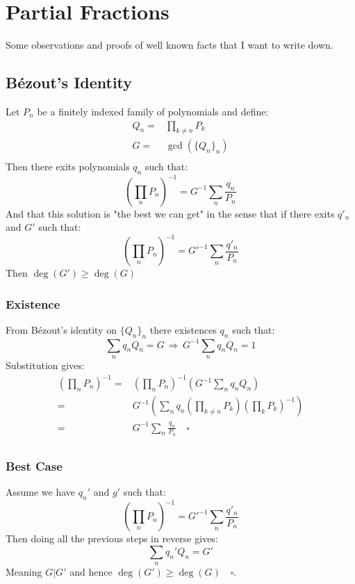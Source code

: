 
\section{Partial Fractions}
Some observations and proofs of well known facts that I want to write down.

\subsection{Bézout's Identity}
Let $P_n$ be a finitely indexed family of polynomials and define:
\begin{equation*}
\begin{aligned}
Q_n =& \prod_{k\neq n}P_k\\
G =&\gcd(\{Q_n\}_n)\\
\end{aligned}
\end{equation*}
Then there exits polynomials $q_n$ such that:
\[\left(\prod_n P_n\right)^{-1} = G^{-1}\sum_n\frac{q_n}{P_n}\]
And that this solution is "the best we can get" in the sense that if there exits $q'_n$ and $G'$ such that:
\[\left(\prod_n P_n\right)^{-1} = G'^{-1}\sum_n\frac{q'_n}{P_n}\]
Then $\deg(G') \geq \deg(G)$

\subsubsection{Existence}
From Bézout's identity on $\{Q_n\}_n$ there existences $q_n$ such that:
\[\sum_n q_n Q_n = G \,\Rightarrow\, G^{-1}\sum_n q_n Q_n = 1\]
Substitution gives:
\begin{equation*}
\begin{aligned}
\left(\prod_n P_n\right)^{-1} =& \left(\prod_n P_n\right)^{-1}\left(G^{-1}\sum_n q_n Q_n\right)\\
=& G^{-1}\left(\sum_n q_n \left(\prod_{k\neq n} P_k\right)\left(\prod_k P_k\right)^{-1}\right)\\
=& G^{-1}\sum_n\frac{q_n}{P_n}\quad \square\\
\end{aligned}
\end{equation*}

\subsubsection{Best Case}
Assume we have $q_n'$ and $g'$ such that:
\[\left(\prod_n P_n\right)^{-1} = G'^{-1}\sum_n\frac{q'_n}{P_n}\]
Then doing all the previous steps in reverse gives:
\[\sum_n q_n' Q_n = G'\]
Meaning $G | G'$ and hence $\deg(G') \geq \deg(G)\quad\square$.

